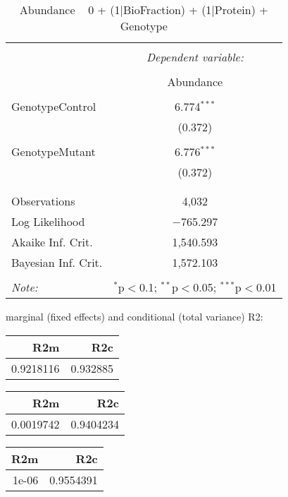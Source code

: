 \documentclass[11pt]{report}
\begin{document}
\begin{table}[!htbp] \centering 
  \caption{Abundance ~ 0 + (1|BioFraction) + (1|Protein) + Genotype} 
  \label{} 
\begin{tabular}{@{\extracolsep{5pt}}lc} 
\\[-1.8ex]\hline 
\hline \\[-1.8ex] 
 & \multicolumn{1}{c}{\textit{Dependent variable:}} \\ 
\cline{2-2} 
\\[-1.8ex] & Abundance \\ 
\hline \\[-1.8ex] 
 GenotypeControl & 6.774$^{***}$ \\ 
  & (0.372) \\ 
  & \\ 
 GenotypeMutant & 6.776$^{***}$ \\ 
  & (0.372) \\ 
  & \\ 
\hline \\[-1.8ex] 
Observations & 4,032 \\ 
Log Likelihood & $-$765.297 \\ 
Akaike Inf. Crit. & 1,540.593 \\ 
Bayesian Inf. Crit. & 1,572.103 \\ 
\hline 
\hline \\[-1.8ex] 
\textit{Note:}  & \multicolumn{1}{r}{$^{*}$p$<$0.1; $^{**}$p$<$0.05; $^{***}$p$<$0.01} \\ 
\end{tabular} 
\end{table} 
marginal (fixed effects) and conditional (total variance) R2:

\begin{tabular}{r|r}
\hline
R2m & R2c\\
\hline
0.9218116 & 0.932885\\
\hline
\end{tabular}

\begin{tabular}{r|r}
\hline
R2m & R2c\\
\hline
0.0019742 & 0.9404234\\
\hline
\end{tabular}

\begin{tabular}{r|r}
\hline
R2m & R2c\\
\hline
1e-06 & 0.9554391\\
\hline
\end{tabular}
\end{document}
